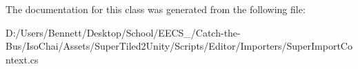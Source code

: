 The documentation for this class was generated from the following file\+:\begin{DoxyCompactItemize}
\item 
D\+:/\+Users/\+Bennett/\+Desktop/\+School/\+E\+E\+C\+S\+\_/\+Catch-\/the-\/\+Bus/\+Iso\+Chai/\+Assets/\+Super\+Tiled2\+Unity/\+Scripts/\+Editor/\+Importers/Super\+Import\+Context.\+cs\end{DoxyCompactItemize}
